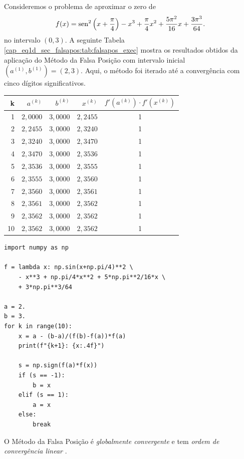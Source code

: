 \begin{ex}
  Consideremos o problema de aproximar o zero de
\begin{equation}
  f(x) = \operatorname{sen}^2\left(x+\frac{\pi}{4}\right) - x^3 + \frac{\pi}{4}x^2 + \frac{5\pi^2}{16}x + \frac{3\pi^3}{64}.
\end{equation}
no intervalo $(0, 3)$. A seguinte Tabela \ref{cap_eq1d_sec_falsapos:tab:falsapos_exec} mostra os resultados obtidos da aplicação do Método da Falsa Posição com intervalo inicial $(a^{(1)}, b^{(1)}) = (2, 3)$. Aqui, o método foi iterado até a convergência com cinco dígitos significativos.
\begin{center}
  \begin{tabular}{r|rr|r|c}
    k & $a^{(k)}$ & $b^{(k)}$ & $x^{(k)}$ & $f'(a^{(k)})\cdot f'(x^{(k)})$\\\hline
    1 & $2,0000$ & $3,0000$ & $2,2455$ & 1 \\
    2 & $2,2455$ & $3,0000$ & $2,3240$ &  1 \\
    3 & $2,3240$ & $3,0000$ & $2,3470$ & 1 \\
    4 & $2,3470$ & $3,0000$ & $2,3536$ & 1 \\
    5 & $2,3536$ & $3,0000$ & $2,3555$ & 1 \\
    6 & $2,3555$ & $3,0000$ & $2,3560$ & 1 \\
    7 & $2,3560$ & $3,0000$ & $2,3561$ &  1 \\
    8 & $2,3561$ & $3,0000$ & $2,3562$ & 1 \\
    9 & $2,3562$ & $3,0000$ & $2,3562$ & 1 \\
    10 & $2,3562$ & $3,0000$ & $2,3562$ & 1 \\\hline
  \end{tabular}
\end{center}

\begin{lstlisting}
import numpy as np

f = lambda x: np.sin(x+np.pi/4)**2 \
    - x**3 + np.pi/4*x**2 + 5*np.pi**2/16*x \
    + 3*np.pi**3/64

a = 2.
b = 3.
for k in range(10):
    x = a - (b-a)/(f(b)-f(a))*f(a)
    print(f"{k+1}: {x:.4f}")

    s = np.sign(f(a)*f(x))
    if (s == -1):
        b = x
    elif (s == 1):
        a = x
    else:
        break
\end{lstlisting}
\end{ex}

\begin{obs}
  O Método da Falsa Posição é \emph{globalmente convergente} e tem \emph{ordem de convergência linear} \cite[Seção 8.3]{Ralston2001a}.
\end{obs}

